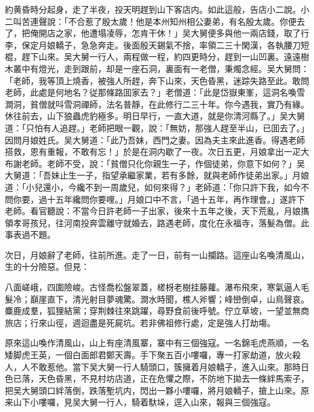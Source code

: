 約黄昏時分起身，走了半夜，投天明趕到山下客店内。如此這般，告店小二說。小二叫苦連聲說：「不合惹了殷太歲！他是本州知州相公妻弟，有名殷太歲。你便去了，把俺開店之家，他遭塌凌辱，怎肯干休！」吴大舅便多與他一兩店錢，取了行李，保定月娘轎子，急急奔走。後面殷天錫氣不捨，率領二三十閑漢，各執腰刀短棍，趕下山來。吴大舅一行人，兩程做一程，約四更時分，趕到一山凹裏。遠遠樹木叢中有燈光，走到跟前，却是一座石洞，裏面有一老僧，秉燭念經。吴大舅問：「老師，我等頂上燒香，被強人所趕，奔下山來，天色昏黑，迷踪失路至此。敢問老師，此處是何地名？従那條路囬家去？」老僧道：「此是岱嶽東峯，這洞名喚雪澗洞，貧僧就呌雪洞禪師，法名普靜，在此修行二三十年。你今遇我，實乃有緣。休往前去，山下狼蟲虎豹極多。明日早行，一直大道，就是你清河縣了。」吴大舅道：「只怕有人追趕。」老師把眼一觀，說：「無妨，那強人趕至半山，已囬去了。」因問月娘姓氏。吴大舅道：「此乃吾妹，西門之妻。因為夫主來此進香。得遇老師搭救，恩有重報，不敢有忘！」於是在洞内歇了一夜。次日五更，月娘拿出一疋大布謝老師。老師不受，說：「貧僧只化你親生一子，作個徒弟，你意下如何？」吴大舅道：「吾妹止生一子，指望承繼家業，若有多餘，就與老師作徒弟出家。」月娘道：「小兒還小，今纔不到一周歲兒，如何來得？」老師道：「你只許下我，如今不問你要，過十五年纔問你要哩。」月娘口中不言，「過十五年，再作理會。」遂許下老師。看官聽說：不當今日許老師一子出家，後來十五年之後，天下荒亂，月娘㩦領孝哥孩兒，往河南投奔雲離守就婚去，路遇老師，度化在永福寺，落髮為僧。此事表過不題。

次日，月娘辭了老師，往前所進。走了一日，前有一山攔路。這座山名喚清風山，生的十分險惡。但見：

八面嵯峨，四圍險峻。古怪喬松盤翠蓋，槎枒老樹挂藤蘿。瀑布飛來，寒氣逼人毛髮冷；巔崖直下，清光射目夢魂驚。澗水時聞，樵人斧響；峰巒倒卓，山鳥聲哀。麋鹿成羣，狐狸結黨；穿荆棘往來跳躍，尋野食前後呼號。佇立草坡，一望並無商旅店；行來山徑，週迴盡是死屍坑。若非佛祖修行處，定是強人打劫塲。

原來這山喚作清風山，山上有座清風寨，寨中有三個強寇。一名錦毛虎燕順，一名矮脚虎王英，一個白面郎君鄭天壽。手下聚五百小嘍囉，專一打家劫道，放火殺人，人不敢惹他。當下吴大舅一行人騎頭口，簇擁着月娘轎子，進入山來。那時日色已落，天色昏黑，不見村坊店道，正在危懼之際，不防地下拋去一條絆馬索子，把吴大舅頭口絆落倒，跌落塹坑内，閃出一夥小嘍囉，將月娘轎子，搶上山來。原来山下小嘍囉，見吴大舅一行人，騎着馱垛，逕入山來，報與三個強寇。

